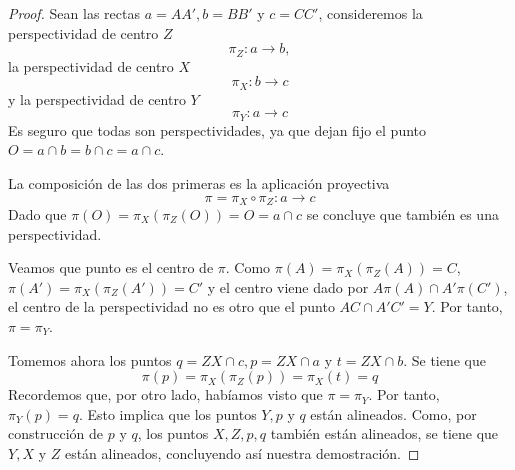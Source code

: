 \begin{proof}
	Sean las rectas $a=AA',b=BB'$ y $c=CC'$, consideremos la perspectividad de centro $Z$
	\[\pi_Z:a\rightarrow b,\]
	la perspectividad de centro $X$
	\[\pi_X:b\rightarrow c\]
	y la perspectividad de centro $Y$
	\[\pi_Y:a\rightarrow c\]
	Es seguro que todas son perspectividades, ya que dejan fijo el punto $O=a\cap b=b\cap c=a\cap c$.
	
	La composición de las dos primeras es la aplicación proyectiva
	\[\pi=\pi_X\circ \pi_Z:a\rightarrow c\]
	Dado que $\pi(O)=\pi_X(\pi_Z(O))=O=a\cap c$ se concluye que también es una perspectividad.
	
	Veamos que punto es el centro de $\pi$. Como $\pi(A)=\pi_X(\pi_Z(A))=C$, $\pi(A')=\pi_X(\pi_Z(A'))=C'$ y el centro viene dado por $A\pi(A)\cap A'\pi(C')$, el centro de la perspectividad no es otro que el punto $AC\cap A'C'=Y$. Por tanto, $\pi=\pi_Y$.
	
	Tomemos ahora los puntos $q=ZX\cap c,p=ZX\cap a$ y $t=ZX\cap b$. Se tiene que
	\[\pi(p)=\pi_X(\pi_Z(p))=\pi_X(t)=q\]
	Recordemos que, por otro lado, habíamos visto que $\pi=\pi_Y$. Por tanto, $\pi_Y(p)=q$. Esto implica que los puntos $Y,p$ y $q$ están alineados. Como, por construcción de $p$ y $q$, los puntos $X,Z,p,q$ también están alineados, se tiene que $Y,X$ y $Z$ están alineados, concluyendo así nuestra demostración.
\end{proof}